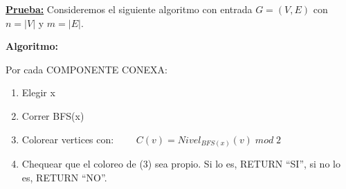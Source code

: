 \documentclass[12pt,a4paper]{report}
\providecommand{\abs}[1]{\lvert#1\rvert}
\begin{document}
		\textbf{\underline{Prueba:}} Consideremos el siguiente algoritmo con entrada $G = (V, E)$ con $n = \abs{V}$ y $m = \abs{E}$.

			\vspace{5mm}
			\par \textbf{Algoritmo:}
			\par Por cada COMPONENTE CONEXA:
				\begin{enumerate}
					\item Elegir x
					\item Correr BFS(x)
					\item Colorear vertices con: $\qquad	C(v) = Nivel_{BFS(x)}(v) \; mod \; 2$
					\item Chequear que el coloreo de (3) sea propio. Si lo es, RETURN \textquotedblleft SI\textquotedblright, si no lo es, RETURN \textquotedblleft NO\textquotedblright.
				\end{enumerate}
\end{document}
